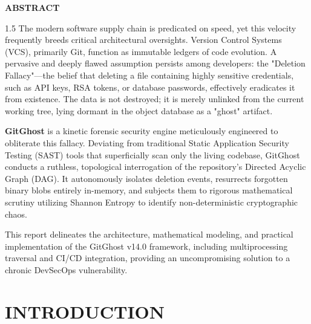 \documentclass[12pt, a4paper, oneside]{report}
\begin{document}
\begin{center}
    {\Large \textbf{ABSTRACT} \par}
\end{center}
\vspace{1cm}
\begin{spacing}{1.5}
The modern software supply chain is predicated on speed, yet this velocity frequently breeds critical architectural oversights. Version Control Systems (VCS), primarily Git, function as immutable ledgers of code evolution. A pervasive and deeply flawed assumption persists among developers: the "Deletion Fallacy"---the belief that deleting a file containing highly sensitive credentials, such as API keys, RSA tokens, or database passwords, effectively eradicates it from existence. The data is not destroyed; it is merely unlinked from the current working tree, lying dormant in the object database as a "ghost" artifact.

\textbf{GitGhost} is a kinetic forensic security engine meticulously engineered to obliterate this fallacy. Deviating from traditional Static Application Security Testing (SAST) tools that superficially scan only the living codebase, GitGhost conducts a ruthless, topological interrogation of the repository's Directed Acyclic Graph (DAG). It autonomously isolates deletion events, resurrects forgotten binary blobs entirely in-memory, and subjects them to rigorous mathematical scrutiny utilizing Shannon Entropy to identify non-deterministic cryptographic chaos. 

This report delineates the architecture, mathematical modeling, and practical implementation of the GitGhost v14.0 framework, including multiprocessing traversal and CI/CD integration, providing an uncompromising solution to a chronic DevSecOps vulnerability.
\end{spacing}
\newpage

\renewcommand{\contentsname}{\centering \Large \textbf{CONTENTS}}
\tableofcontents
\newpage
\listoffigures
\newpage


\chapter{INTRODUCTION}
\end{document}
